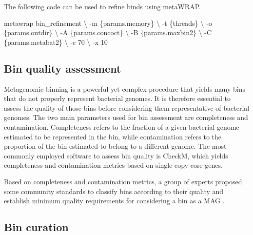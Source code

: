 \documentclass[
]{book}
\newenvironment{Shaded}{\begin{snugshade}}{\end{snugshade}}
\newcommand{\AttributeTok}[1]{\textcolor[rgb]{0.77,0.63,0.00}{#1}}
\newcommand{\DataTypeTok}[1]{\textcolor[rgb]{0.13,0.29,0.53}{#1}}
\newcommand{\ExtensionTok}[1]{#1}
\newcommand{\NormalTok}[1]{#1}
\begin{document}
\normalsize

The following code can be used to refine binds using metaWRAP.
\small

\begin{Shaded}
\begin{Highlighting}[]
\ExtensionTok{metawrap}\NormalTok{ bin\_refinement }\DataTypeTok{\textbackslash{}}
    \AttributeTok{{-}m}\NormalTok{ \{params.memory\} }\DataTypeTok{\textbackslash{}}
    \AttributeTok{{-}t}\NormalTok{ \{threads\} }\DataTypeTok{\textbackslash{}}
    \AttributeTok{{-}o}\NormalTok{ \{params.outdir\} }\DataTypeTok{\textbackslash{}}
    \AttributeTok{{-}A}\NormalTok{ \{params.concoct\} }\DataTypeTok{\textbackslash{}}
    \AttributeTok{{-}B}\NormalTok{ \{params.maxbin2\} }\DataTypeTok{\textbackslash{}}
    \AttributeTok{{-}C}\NormalTok{ \{params.metabat2\} }\DataTypeTok{\textbackslash{}}
    \AttributeTok{{-}c}\NormalTok{ 70 }\DataTypeTok{\textbackslash{}}
    \AttributeTok{{-}x}\NormalTok{ 10}
\end{Highlighting}
\end{Shaded}

\normalsize

\hypertarget{genome-resolved-qc}{%
\subsection*{Bin quality assessment}\label{genome-resolved-qc}}

Metagenomic binning is a powerful yet complex procedure that yields many bins that do not properly represent bacterial genomes. It is therefore essential to assess the quality of those bins before considering them representative of bacterial genomes. The two main parameters used for bin assessment are completeness and contamination. Completeness refers to the fraction of a given bacterial genome estimated to be represented in the bin, while contamination refers to the proportion of the bin estimated to belong to a different genome. The most commonly employed software to assess bin quality is CheckM, which yields completeness and contamination metrics based on single-copy core genes.

Based on completeness and contamination metrics, a group of experts proposed some community standards to classify bins according to their quality and establish minimum quality requirements for considering a bin as a MAG \citep{Bowers2017-kj}.

\hypertarget{genome-resolved-curation}{%
\subsection*{Bin curation}\label{genome-resolved-curation}}
\end{document}
